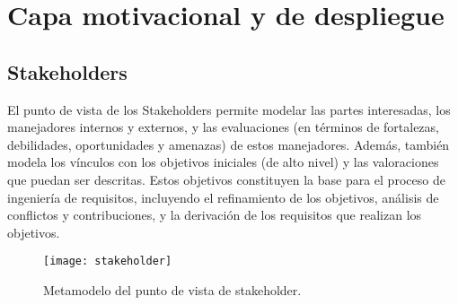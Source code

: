 \chapter{Capa motivacional y de despliegue}

\section{Stakeholders}



El punto de vista de los Stakeholders permite modelar las partes interesadas, los manejadores internos y externos, y las evaluaciones (en términos de fortalezas, debilidades, oportunidades y amenazas) de estos manejadores. Además, también modela los vínculos con los objetivos iniciales (de alto nivel) y las valoraciones que puedan ser descritas. Estos objetivos constituyen la base para el proceso de ingeniería de requisitos, incluyendo el refinamiento de los objetivos, análisis de conflictos y contribuciones, y la derivación de los requisitos que realizan los objetivos.

\begin{figure}[H]
\centering
\texttt{[image: stakeholder]}
\caption{Metamodelo del punto de vista de stakeholder.}
\end{figure}



